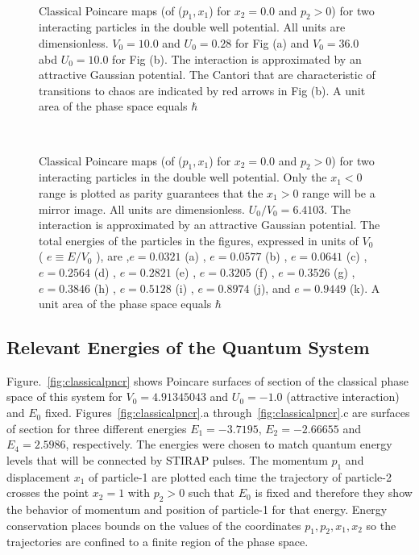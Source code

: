 \begin{figure}
\ 
\caption{Classical Poincare maps (of  ($p_1,x_1$) for $x_2=0.0$ and $p_2>0$) for two interacting particles in the double well potential. All units are dimensionless.  $V_0 = 10.0$ and $U_0 = 0.28$ for Fig (a) and $V_0=36.0$ abd $U_0=10.0$ for Fig (b). The interaction is approximated by an attractive Gaussian  potential. The Cantori that are characteristic of transitions to chaos are indicated by red arrows in Fig (b). A unit area of the phase space equals $\hbar$}
\label{fig:poincare_rep1}
\end{figure}

\begin{figure}
\ 
\caption{Classical Poincare maps (of  ($p_1,x_1$) for $x_2=0.0$ and $p_2>0$) for two interacting particles in the double well potential. Only the $x_1<0$ range is plotted as parity guarantees that the $x_1>0$ range will be a mirror image. All units are dimensionless.  $U_0/V_0 = 6.4103$. The interaction is approximated by an attractive Gaussian  potential. The total energies of the particles in the figures, expressed in units of $V_0$ ( $e\equiv E/V_0$ ), are ,$e=0.0321$ (a) , $e=0.0577$ (b) , $e=0.0641$ (c) , $e=0.2564$ (d) , $e=0.2821$ (e) , $e=0.3205$ (f) , $e=0.3526$ (g) , $e=0.3846$ (h) , $e=0.5128$ (i) , $e=0.8974$ (j), and $e=0.9449$ (k). A unit area of the phase space equals $\hbar$}
\label{fig:poincare_rep2}
\end{figure}
%
%
\subsection{Relevant Energies of the Quantum System}
%
%
Figure.~\ref{fig:classicalpncr} shows Poincare surfaces of section of the classical phase space of this system for $V_0 = 4.91345043$ and $U_0 = -1.0 $ (attractive interaction) and $E_0$ fixed. Figures~\ref{fig:classicalpncr}.a through~\ref{fig:classicalpncr}.c are surfaces of section for three different energies $E_1 = -3.7195$, $E_2 = -2.66655$ and $E_4 = 2.5986$, respectively. The energies were chosen to match quantum energy levels that will be connected by STIRAP pulses.  The momentum $p_1$ and displacement $x_1$ of particle-1 are plotted each time the trajectory of particle-2 crosses the point  $x_2 = 1$  with $p_2 > 0$ such that $E_0$ is fixed and therefore they show the behavior of  momentum and position of particle-1 for that energy. Energy conservation places bounds on the values of  the coordinates $p_1, p_2, x_1, x_2$ so the trajectories are confined to a finite region of the phase space. 

